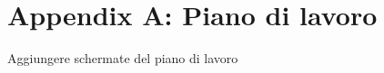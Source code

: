 \renewcommand\thechapter{A}
\chapter{Appendix A: Piano di lavoro}
\label{AppendixA}

Aggiungere schermate del piano di lavoro
